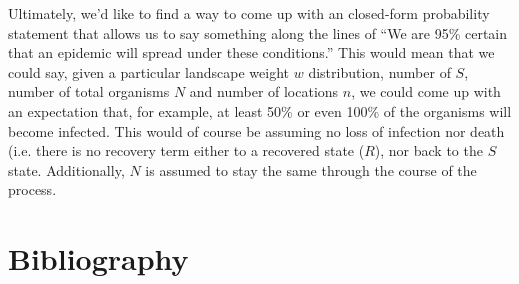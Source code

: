 Ultimately, we'd like to find a way to come up with an closed-form probability statement that allows us to say something along the lines of ``We are 95\% certain that an epidemic will spread under these conditions.'' This would mean that we could say, given a particular landscape weight $w$ distribution, number of $S$, number of total organisms $N$ and number of locations $n$, we could come up with an expectation that, for example, at least 50\% or even 100\% of the organisms will become infected. This would of course be assuming no loss of infection nor death (i.e. there is no recovery term either to a recovered state ($R$), nor back to the $S$ state. Additionally, $N$ is assumed to stay the same through the course of the process.





\section*{Bibliography}

